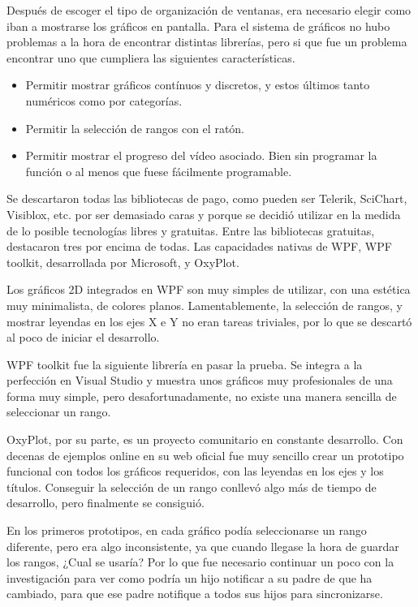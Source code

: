 Despu\'es de escoger el tipo de organizaci\'on de ventanas, era necesario elegir como iban a mostrarse los gr\'aficos en pantalla.
Para el sistema de gr\'aficos no hubo problemas a la hora de encontrar distintas librer\'ias, pero si que fue un 
problema encontrar uno que cumpliera las siguientes caracter\'isticas.

\begin{itemize}
	\item Permitir mostrar gr\'{a}ficos cont\'{i}nuos y discretos, y estos \'{u}ltimos tanto num\'{e}ricos como por categor\'{i}as.
	\item Permitir la selecci\'{o}n de rangos con el rat\'{o}n.
	\item Permitir mostrar el progreso del v\'{i}deo asociado. Bien sin programar la funci\'{o}n o al menos que fuese f\'{a}cilmente programable.
\end{itemize}

Se descartaron todas las bibliotecas de pago, como pueden ser Telerik, SciChart, Visiblox, etc. por ser demasiado caras
y porque se decidi\'o utilizar en la medida de lo posible tecnolog\'ias libres y gratuitas. Entre las bibliotecas
gratuitas, destacaron tres por encima de todas. Las capacidades nativas de WPF,
WPF toolkit, desarrollada por Microsoft, y OxyPlot.

Los gr\'aficos 2D integrados en WPF son muy simples de utilizar, con una est\'etica muy minimalista, de colores planos.
Lamentablemente, la selecci\'on de rangos, y mostrar leyendas en los ejes X e Y no eran tareas triviales, por lo que
se descart\'o al poco de iniciar el desarrollo.

WPF toolkit fue la siguiente librer\'ia en pasar la prueba. Se integra a la perfecci\'on 
en Visual Studio y muestra unos gr\'aficos muy profesionales de una forma
muy simple, pero desafortunadamente, no existe una manera sencilla de seleccionar un rango.

OxyPlot, por su parte, es un proyecto comunitario en constante desarrollo. Con decenas de ejemplos online en su web
oficial fue muy sencillo crear un prototipo funcional con todos los gr\'aficos requeridos, con las leyendas en los ejes
y los t\'itulos. Conseguir la selecci\'on de un rango conllev\'o algo m\'as de tiempo de desarrollo, pero finalmente 
se consigui\'o.

En los primeros prototipos, en cada gr\'afico pod\'ia seleccionarse un rango diferente, pero era algo inconsistente, ya
que cuando llegase la hora de guardar los rangos, ¿Cual se usar\'ia? Por lo que fue necesario continuar un poco con la 
investigaci\'on para ver como podr\'ia un hijo notificar a su padre de que ha cambiado, para que ese padre notifique a todos
sus hijos para sincronizarse.

